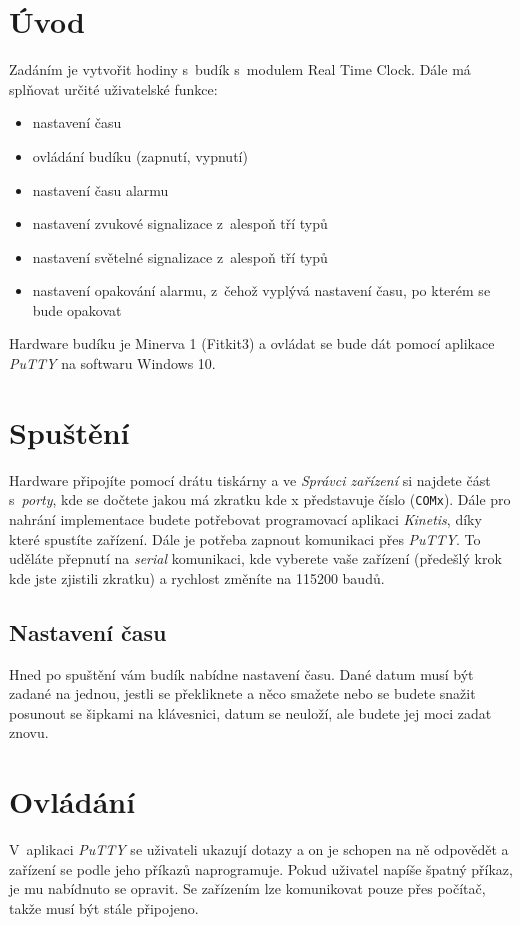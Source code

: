 \documentclass[11pt,a4paper]{article}
\begin{document}
\section{Úvod}
Zadáním je vytvořit hodiny s~budík s~modulem Real Time Clock. Dále má splňovat určité uživatelské funkce:

\begin{itemize}
        \item nastavení času
        \item ovládání budíku (zapnutí, vypnutí)
        \item nastavení času alarmu
        \item nastavení zvukové signalizace z~alespoň tří typů
        \item nastavení světelné signalizace z~alespoň tří typů
        \item nastavení opakování alarmu, z~čehož vyplývá nastavení času, po kterém se bude opakovat
    \end{itemize}

Hardware budíku je Minerva 1 (Fitkit3) a ovládat se bude dát pomocí aplikace \emph{PuTTY} na softwaru Windows 10.

\section{Spuštění}
Hardware připojíte pomocí drátu tiskárny a ve \emph{Správci zařízení} si najdete část s~\emph{porty}, kde se dočtete jakou má zkratku kde x představuje číslo (\verb|COMx|). Dále pro nahrání implementace budete potřebovat programovací aplikaci \emph{Kinetis}, díky které spustíte zařízení. Dále je potřeba zapnout komunikaci přes \emph{PuTTY}. To uděláte přepnutí na \emph{serial} komunikaci, kde vyberete vaše zařízení (předešlý krok kde jste zjistili zkratku) a rychlost změníte na 115200 baudů.

\subsection{Nastavení času}
Hned po spuštění vám budík nabídne nastavení času. Dané datum musí být zadané na jednou, jestli se překliknete a něco smažete nebo se budete snažit posunout se šipkami na klávesnici, datum se neuloží, ale budete jej moci zadat znovu.

\section{Ovládání}
V~aplikaci \emph{PuTTY} se uživateli ukazují dotazy a on je schopen na ně odpovědět a zařízení se podle jeho příkazů naprogramuje. Pokud uživatel napíše špatný příkaz, je mu nabídnuto se opravit. Se zařízením lze komunikovat pouze přes počítač, takže musí být stále připojeno.
\end{document}

